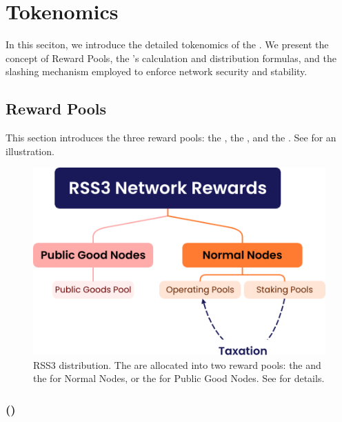 \section{Tokenomics}
\label{sec:tokenomics}

In this seciton, we introduce the detailed tokenomics of the . We present the concept of Reward Pools, the 's calculation and distribution formulas, and the slashing mechanism employed to enforce network security and stability.

\subsection{Reward Pools}
\label{subsec:reward_pools}

This section introduces the three reward pools: the , the , and the . See  for an illustration.

    {
        \begin{figure}[tb!]
            \centering
            \includegraphics[width=0.9\columnwidth]{figures/network-rewards.png}
            \caption{RSS3  distribution.
                The  are allocated into two reward pools: the  and the  for Normal Nodes, or the  for Public Good Nodes.
                See  for details.}
            \label{fig:network-rewards}
        \end{figure}
    }

\subsubsection{ (\operationPool)}
\label{subsubsec:operation_pool}

